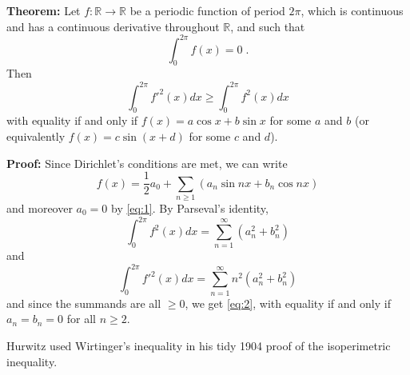 \documentclass[12pt]{article}
\begin{document}
\newcommand{\R}{\mathbb{R}}

\textbf{Theorem: }
Let $f\colon\R\to\R$ be a periodic function of period $2\pi$, which is
continuous and has a continuous derivative throughout $\R$, and such
that
\begin{equation} \label{eq:1}
\int_0^{2\pi}f(x)=0\;.
\end{equation}
Then
\begin{equation} \label{eq:2}
\int_0^{2\pi}f'^2(x)dx\ge\int_0^{2\pi}f^2(x)dx
\end{equation}
with equality if and only if $f(x)=a\cos x+b\sin x$ for some $a$ and $b$
(or equivalently $f(x)=c\sin (x+d)$ for some $c$ and $d$).

\textbf{Proof: }Since Dirichlet's conditions are met, we
can write
$$f(x)=\frac{1}{2}a_0+\sum_{n\ge 1}(a_n\sin nx+b_n\cos nx)$$
and moreover $a_0=0$ by \eqref{eq:1}. By Parseval's identity,
$$\int_0^{2\pi}f^2(x)dx=\sum_{n=1}^\infty(a_n^2+b_n^2)$$
and
$$\int_0^{2\pi}f'^2(x)dx=\sum_{n=1}^\infty n^2(a_n^2+b_n^2)$$
and since the summands are all $\ge 0$, we get \eqref{eq:2},
with equality if and only if $a_n=b_n=0$ for all $n\ge 2$.

Hurwitz used Wirtinger's inequality in his tidy 1904
proof of the isoperimetric inequality.
\end{document}
